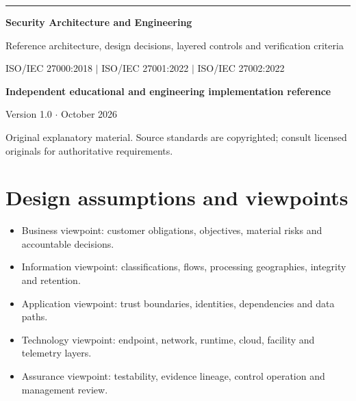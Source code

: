 \documentclass[11pt,letterpaper]{article}
\begin{document}
\begin{titlepage}
\vspace*{1.2in}
{\color{teal}\rule{\textwidth}{4pt}}\par\vspace{20pt}
{\Huge\bfseries\color{navy} Security Architecture and Engineering}\par\vspace{18pt}
{\Large\color{graytext} Reference architecture, design decisions, layered controls and verification criteria}\par\vspace{1.3in}
{\large ISO/IEC 27000:2018 $\vert$ ISO/IEC 27001:2022 $\vert$ ISO/IEC 27002:2022}\par
\vfill
\textbf{Independent educational and engineering implementation reference}\par
Version 1.0 $\cdot$ October 2026\par
{\small Original explanatory material. Source standards are copyrighted; consult licensed originals for authoritative requirements.}\par
\end{titlepage}
\tableofcontents\clearpage{}
\section{Design assumptions and viewpoints}
\begin{itemize}
\item Business viewpoint: customer obligations, objectives, material risks and accountable decisions.
\item Information viewpoint: classifications, flows, processing geographies, integrity and retention.
\item Application viewpoint: trust boundaries, identities, dependencies and data paths.
\item Technology viewpoint: endpoint, network, runtime, cloud, facility and telemetry layers.
\item Assurance viewpoint: testability, evidence lineage, control operation and management review.
\end{itemize}
\end{document}
